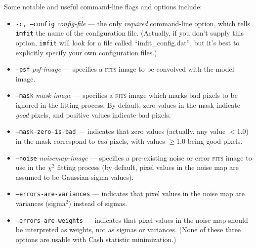 \documentclass[10pt,a4paper,article]{memoir}
\newcommand{\imfit}{\texttt{imfit}}
\newcommand{\chisquare}{\ensuremath{\chi^{2}}}
\begin{document}
Some notable and useful command-line flags and options include:
\begin{itemize}
\item \texttt{-c, --config} \textit{config-file} --- the only \textit{required}
command-line option, which tells \imfit{} the name of the configuration file.
(Actually, if you don't supply this option, \imfit{} will look for a file
called ``imfit\_config.dat'', but it's best to explicitly specify your own
configuration files.)

\bigskip

\item \texttt{--psf} \textit{psf-image} --- specifies a \textsc{fits} image to be convolved
with the model image.

\bigskip

\item \texttt{--mask} \textit{mask-image} --- specifies a \textsc{fits} image which marks
bad pixels to be ignored in the fitting process. By default, zero values in
the mask indicate \textit{good} pixels, and positive values indicate bad pixels.
\item \texttt{--mask-zero-is-bad} --- indicates that zero values (actually,
any value $< 1.0$) in the mask correspond to \textit{bad} pixels, with values
$\geq 1.0$ being good pixels.

\bigskip

\item \texttt{--noise} \textit{noisemap-image} --- specifies a pre-existing noise
or error \textsc{fits} image to use in the \chisquare{} fitting process (by default, pixel values in the
noise map are assumed to be Gaussian sigma values).
\item \texttt{--errors-are-variances} --- indicates that pixel values in the noise
map are variances (sigma$^2$) instead of sigmas.
\item \texttt{--errors-are-weights} --- indicates that pixel values in the noise
map should be interpreted as weights, not as sigmas or variances. (None
of these three options are usable with Cash statistic minimization.)

\bigskip


\end{itemize}
\end{document}
